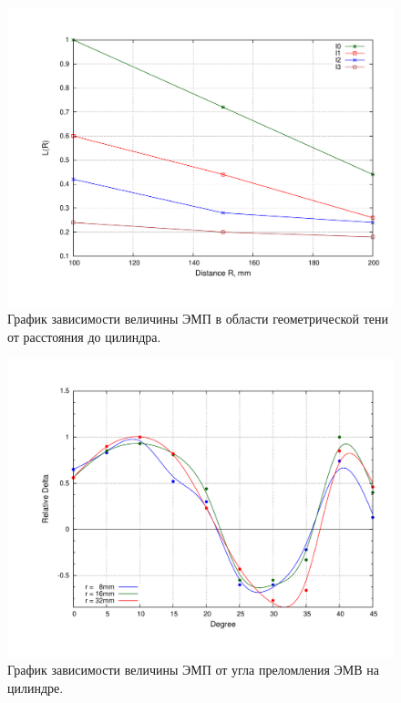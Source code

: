 \documentclass[10pt,a4paper,oneside, reqno]{amsproc}
\begin{document}
\vspace{-10pt}
\begin{figure}[h!t]
    \centering
    \includegraphics[width = \textwidth]{plot1.pdf}
    \vspace{-30pt}
    \caption{График зависимости величины ЭМП в области геометрической тени от расстояния до цилиндра.}
    \label{fig:plot1}
\end{figure}

\begin{figure}[h!t]
    \centering
    \includegraphics[width = \textwidth]{plot2.pdf}
    \vspace{-30pt}
    \caption{График зависимости величины ЭМП от угла преломления ЭМВ на цилиндре.}
    \label{fig:plot2}
\end{figure}
\end{document}

